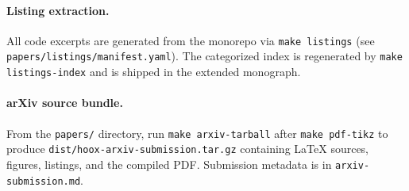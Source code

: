 \paragraph{Listing extraction.} All code excerpts are generated from the monorepo via \texttt{make listings} (see \texttt{papers/listings/manifest.yaml}). The categorized index is regenerated by \texttt{make listings-index} and is shipped in the extended monograph.

\paragraph{arXiv source bundle.} From the \texttt{papers/} directory, run \texttt{make arxiv-tarball} after \texttt{make pdf-tikz} to produce \texttt{dist/hoox-arxiv-submission.tar.gz} containing \LaTeX{} sources, figures, listings, and the compiled PDF. Submission metadata is in \texttt{arxiv-submission.md}.
